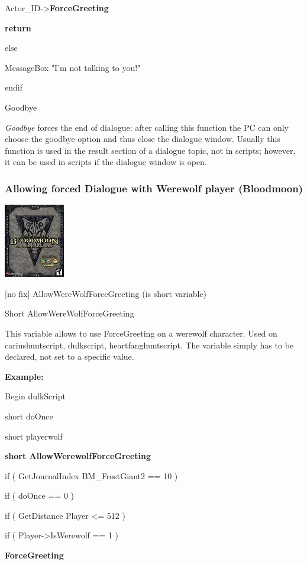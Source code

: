 \documentclass[
]{article}
\begin{document}
Actor\_ID-\textgreater{}\textbf{ForceGreeting~}

\textbf{return}

else

MessageBox "I'm not talking to you!"

endif

Goodbye

\emph{Goodbye} forces the end of dialogue: after calling this function
the PC can only choose the goodbye option and thus close the dialogue
window. Usually this function is used in the result section of a
dialogue topic, not in scripts; however, it can be used in scripts if
the dialogue window is open.

\hypertarget{allowing-forced-dialogue-with-werewolf-player-bloodmoon}{%
\subsubsection{Allowing forced Dialogue with Werewolf player
(Bloodmoon)}\label{allowing-forced-dialogue-with-werewolf-player-bloodmoon}}

\includegraphics{media/image7.png}

{[}no fix{]} AllowWereWolfForceGreeting (is short variable)

Short AllowWereWolfForceGreeting

This variable allows to use ForceGreeting on a werewolf character. Used
on cariushuntscript, dulkscript, heartfanghuntscript. The variable
simply has to be declared, not set to a specific value.

\textbf{Example:}

Begin dulkScript

short doOnce

short playerwolf

\textbf{short AllowWerewolfForceGreeting}

if ( GetJournalIndex BM\_FrostGiant2 == 10 )

if ( doOnce == 0 )

if ( GetDistance Player \textless= 512 )

if ( Player-\textgreater IsWerewolf == 1 )

\textbf{ForceGreeting}
\end{document}

